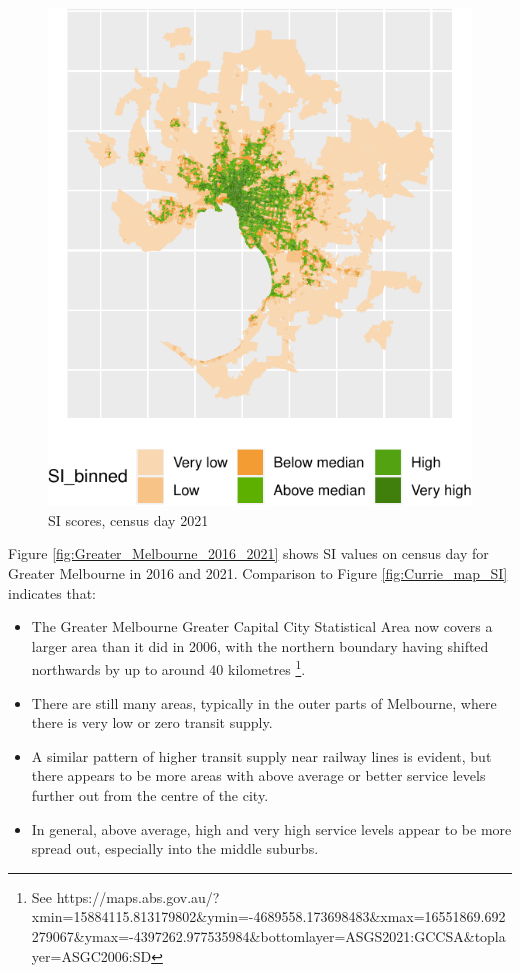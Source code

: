\documentclass[preprint, 3p,
authoryear]{elsarticle} %
\providecommand{\tightlist}{%
  \setlength{\itemsep}{0pt}\setlength{\parskip}{0pt}}
\begin{document}
\begin{figure}
\centering
\includegraphics{Leveraging_GTFS_to_assess_transit_supply_Transport_Geography_files/figure-latex/Greater_Melbourne_2016_2021-1.pdf}
\caption{SI scores, census day 2021}
\end{figure}

Figure \ref{fig:Greater_Melbourne_2016_2021} shows SI values on census
day for Greater Melbourne in 2016 and 2021. Comparison to Figure
\ref{fig:Currie_map_SI} indicates that:

\begin{itemize}
\tightlist
\item
  The Greater Melbourne Greater Capital City Statistical Area now covers
  a larger area than it did in 2006, with the northern boundary having
  shifted northwards by up to around 40 kilometres \footnote{See
    https://maps.abs.gov.au/?xmin=15884115.813179802\&ymin=-4689558.173698483\&xmax=16551869.692279067\&ymax=-4397262.977535984\&bottomlayer=ASGS2021:GCCSA\&toplayer=ASGC2006:SD}.
\item
  There are still many areas, typically in the outer parts of Melbourne,
  where there is very low or zero transit supply.
\item
  A similar pattern of higher transit supply near railway lines is
  evident, but there appears to be more areas with above average or
  better service levels further out from the centre of the city.
\item
  In general, above average, high and very high service levels appear to
  be more spread out, especially into the middle suburbs.
\end{itemize}
\end{document}
